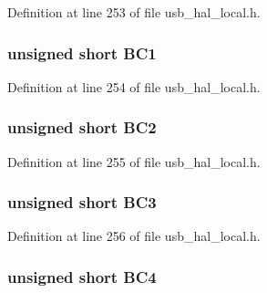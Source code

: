 Definition at line 253 of file usb\+\_\+hal\+\_\+local.\+h.

\hypertarget{union___b_y_t_e_c_o_u_n_t_a17606c78aac4f5fb568d104e134378bc}{}
\subsubsection[{B\+C1}]{\setlength{\rightskip}{0pt plus 5cm}unsigned short B\+C1}\label{union___b_y_t_e_c_o_u_n_t_a17606c78aac4f5fb568d104e134378bc}


Definition at line 254 of file usb\+\_\+hal\+\_\+local.\+h.

\hypertarget{union___b_y_t_e_c_o_u_n_t_a79dd7b432e492b89608ac9f89c1daed0}{}
\subsubsection[{B\+C2}]{\setlength{\rightskip}{0pt plus 5cm}unsigned short B\+C2}\label{union___b_y_t_e_c_o_u_n_t_a79dd7b432e492b89608ac9f89c1daed0}


Definition at line 255 of file usb\+\_\+hal\+\_\+local.\+h.

\hypertarget{union___b_y_t_e_c_o_u_n_t_afa61d0e57d43d4f3f3608c0367ae7437}{}
\subsubsection[{B\+C3}]{\setlength{\rightskip}{0pt plus 5cm}unsigned short B\+C3}\label{union___b_y_t_e_c_o_u_n_t_afa61d0e57d43d4f3f3608c0367ae7437}


Definition at line 256 of file usb\+\_\+hal\+\_\+local.\+h.

\hypertarget{union___b_y_t_e_c_o_u_n_t_a70b62fb2a0858fd090ac06ba2418e456}{}
\subsubsection[{B\+C4}]{\setlength{\rightskip}{0pt plus 5cm}unsigned short B\+C4}\label{union___b_y_t_e_c_o_u_n_t_a70b62fb2a0858fd090ac06ba2418e456}


